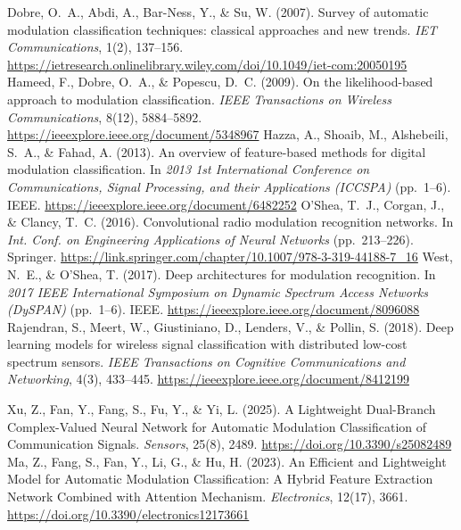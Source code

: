 \documentclass[conference]{IEEEtran}
\begin{document}
\begin{thebibliography}{00}

 Dobre, O.~A., Abdi, A., Bar-Ness, Y., \& Su, W. (2007). Survey of automatic modulation classification techniques: classical approaches and new trends. \emph{IET Communications}, 1(2), 137--156. \url{https://ietresearch.onlinelibrary.wiley.com/doi/10.1049/iet-com:20050195}
 Hameed, F., Dobre, O.~A., \& Popescu, D.~C. (2009). On the likelihood-based approach to modulation classification. \emph{IEEE Transactions on Wireless Communications}, 8(12), 5884--5892. \url{https://ieeexplore.ieee.org/document/5348967}
 Hazza, A., Shoaib, M., Alshebeili, S.~A., \& Fahad, A. (2013). An overview of feature-based methods for digital modulation classification. In \emph{2013 1st International Conference on Communications, Signal Processing, and their Applications (ICCSPA)} (pp.~1--6). IEEE. \url{https://ieeexplore.ieee.org/document/6482252}
 O'Shea, T.~J., Corgan, J., \& Clancy, T.~C. (2016). Convolutional radio modulation recognition networks. \allowbreak
In \emph{Int. Conf. on Engineering Applications of Neural Networks} (pp.~213--226). Springer. 
\url{https://link.springer.com/chapter/10.1007/978-3-319-44188-7_16}
 West, N.~E., \& O'Shea, T. (2017). Deep architectures for modulation recognition. 
In \emph{2017 IEEE International Symposium on Dynamic Spectrum Access Networks (DySPAN)} (pp.~1--6). IEEE. 
\url{https://ieeexplore.ieee.org/document/8096088}
 Rajendran, S., Meert, W., Giustiniano, D., Lenders, V., \& Pollin, S. (2018). Deep learning models for wireless signal classification with distributed low-cost spectrum sensors. 
\emph{IEEE Transactions on Cognitive Communications and Networking}, 4(3), 433--445. 
\url{https://ieeexplore.ieee.org/document/8412199}

 Xu, Z., Fan, Y., Fang, S., Fu, Y., \& Yi, L. (2025). A Lightweight Dual-Branch Complex-Valued Neural Network for Automatic Modulation Classification of Communication Signals. \emph{Sensors}, 25(8), 2489. \url{https://doi.org/10.3390/s25082489}
 Ma, Z., Fang, S., Fan, Y., Li, G., \& Hu, H. (2023). An Efficient and Lightweight Model for Automatic Modulation Classification: A Hybrid Feature Extraction Network Combined with Attention Mechanism. \emph{Electronics}, 12(17), 3661. \url{https://doi.org/10.3390/electronics12173661}


\end{thebibliography}
\end{document}

